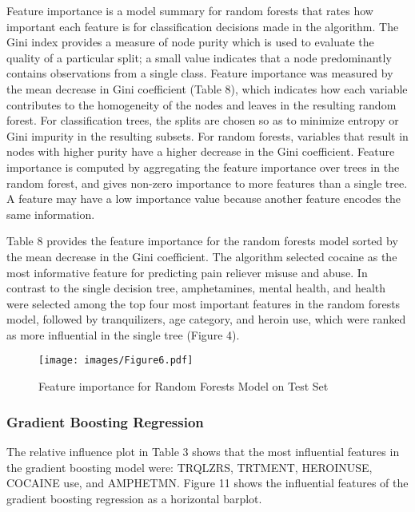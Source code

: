 \documentclass[sigconf]{acmart}
\begin{document}
Feature importance is a model summary for random forests 
that rates how important each feature is for classification decisions made 
in the algorithm. The Gini index provides a measure of node purity which is 
used to evaluate the quality of a particular split; a small value indicates 
that a node predominantly contains observations from a single class. 
Feature importance was measured by the mean decrease in Gini coefficient 
(Table 8), which indicates how each variable contributes to the homogeneity 
of the nodes and leaves in the resulting random forest. For classification 
trees, the splits are chosen so as to minimize entropy or Gini impurity in 
the resulting subsets. For random forests, variables that result in nodes 
with higher purity have a higher decrease in the Gini coefficient. Feature 
importance is computed by aggregating the feature importance over trees in 
the random forest, and gives non-zero importance to more features than a 
single tree. A feature may have a low importance value because another feature 
encodes the same information. 



Table 8 provides the feature importance for 
the random forests model sorted by the mean decrease in the Gini coefficient. 
The algorithm selected cocaine as the most informative feature for predicting 
pain reliever misuse and abuse. In contrast to the single decision tree, 
amphetamines, mental health, and health were selected among the top four most 
important features in the random forests model, followed by tranquilizers, 
age category, and heroin use, which were ranked as more influential in the 
single tree (Figure 4). 

\begin{figure}[!ht]
  \centering\texttt{[image: images/Figure6.pdf]}
  \caption{Feature importance for Random Forests Model on Test Set}
  \label{f:Figure6}
\end{figure}




\subsubsection{Gradient Boosting Regression}

The relative influence plot in Table 3 shows that the most 
influential features in the gradient boosting model were: TRQLZRS, TRTMENT,
HEROINUSE, COCAINE use, and AMPHETMN. Figure 11 shows the influential 
features of the gradient boosting regression as a horizontal barplot. 
\end{document}
